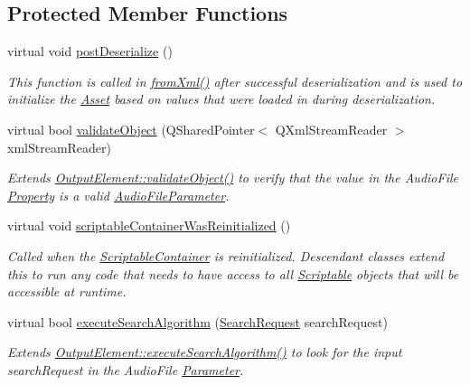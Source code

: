 \subsection*{Protected Member Functions}
\begin{DoxyCompactItemize}
\item 
virtual void \hyperlink{class_picto_1_1_audio_element_ae8847ae3b72666aae30c60bf045afda8}{post\-Deserialize} ()
\begin{DoxyCompactList}\small\item\em This function is called in \hyperlink{class_picto_1_1_asset_a8bed4da09ecb1c07ce0dab313a9aba67}{from\-Xml()} after successful deserialization and is used to initialize the \hyperlink{class_picto_1_1_asset}{Asset} based on values that were loaded in during deserialization. \end{DoxyCompactList}\item 
\hypertarget{class_picto_1_1_audio_element_a77706885502e3c734a9f43db5ee40d9b}{virtual bool \hyperlink{class_picto_1_1_audio_element_a77706885502e3c734a9f43db5ee40d9b}{validate\-Object} (Q\-Shared\-Pointer$<$ Q\-Xml\-Stream\-Reader $>$ xml\-Stream\-Reader)}\label{class_picto_1_1_audio_element_a77706885502e3c734a9f43db5ee40d9b}

\begin{DoxyCompactList}\small\item\em Extends \hyperlink{class_picto_1_1_scriptable_container_a127c17469b1823ce4368bbf9d5df7b78}{Output\-Element\-::validate\-Object()} to verify that the value in the Audio\-File \hyperlink{class_picto_1_1_property}{Property} is a valid \hyperlink{class_picto_1_1_audio_file_parameter}{Audio\-File\-Parameter}. \end{DoxyCompactList}\item 
virtual void \hyperlink{class_picto_1_1_audio_element_ae673367d1fc705e6661ccd953d9764a9}{scriptable\-Container\-Was\-Reinitialized} ()
\begin{DoxyCompactList}\small\item\em Called when the \hyperlink{class_picto_1_1_scriptable_container}{Scriptable\-Container} is reinitialized. Descendant classes extend this to run any code that needs to have access to all \hyperlink{class_picto_1_1_scriptable}{Scriptable} objects that will be accessible at runtime. \end{DoxyCompactList}\item 
\hypertarget{class_picto_1_1_audio_element_a6d4765ccf4fd45078a6bfb334e521a2d}{virtual bool \hyperlink{class_picto_1_1_audio_element_a6d4765ccf4fd45078a6bfb334e521a2d}{execute\-Search\-Algorithm} (\hyperlink{struct_search_request}{Search\-Request} search\-Request)}\label{class_picto_1_1_audio_element_a6d4765ccf4fd45078a6bfb334e521a2d}

\begin{DoxyCompactList}\small\item\em Extends \hyperlink{class_picto_1_1_scriptable_container_aae46c50e128e021f5ad66cb8b419c65a}{Output\-Element\-::execute\-Search\-Algorithm()} to look for the input search\-Request in the Audio\-File \hyperlink{class_picto_1_1_parameter}{Parameter}. \end{DoxyCompactList}\end{DoxyCompactItemize}
